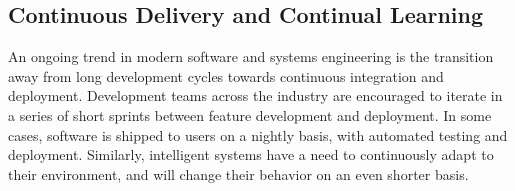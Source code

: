 \documentclass[12pt,initial,twoside,maitrise]{dms}
\numberwithin{equation}{section}
\numberwithin{table}{chapter}
\numberwithin{figure}{chapter}
\begin{document}
\subsection{Continuous Delivery and Continual Learning}

An ongoing trend in modern software and systems engineering is the transition away from long development cycles towards continuous integration and deployment. Development teams across the industry are encouraged to iterate in a series of short sprints between feature development and deployment. In some cases, software is shipped to users on a nightly basis, with automated testing and deployment. Similarly, intelligent systems have a need to continuously adapt to their environment, and will change their behavior on an even shorter basis.



%
%



\end{document}
